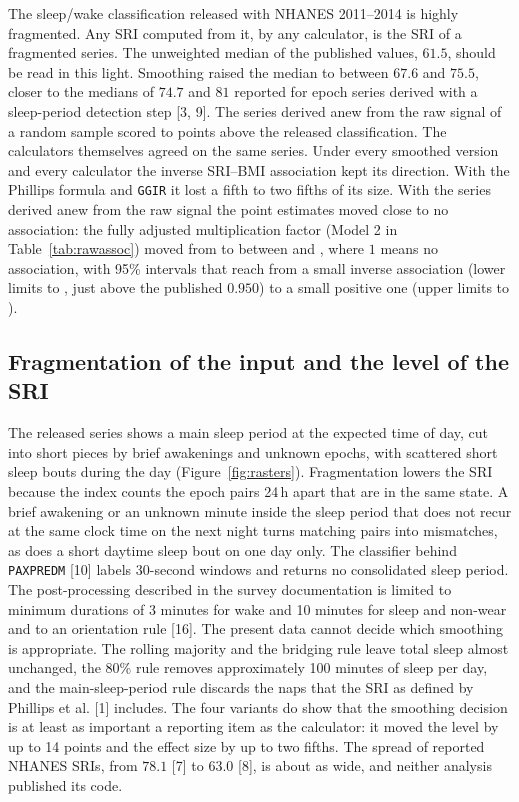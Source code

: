 \documentclass[12pt]{article}
\begin{document}
The sleep/wake classification released with NHANES 2011--2014 is highly fragmented. Any SRI computed from it, by any calculator, is the SRI of a fragmented series. The unweighted median of the published values, $61.5$, should be read in this light. Smoothing raised the median to between $67.6$ and $75.5$, closer
to the medians of $74.7$ and $81$ reported for epoch series derived with a
sleep-period detection step [3, 9]. The series derived anew from the raw signal of a random sample scored \rawSwanDiffMean{} to \rawGgirSptDiffMean{} points above the released
classification. The calculators themselves agreed on the same series. Under every smoothed version and every calculator the inverse SRI--BMI association kept its direction. With the Phillips formula and \texttt{GGIR} it lost a fifth to two fifths of its size. With the series derived anew from the raw signal the point estimates moved close to no association: the fully adjusted multiplication factor (Model 2 in Table~\ref{tab:rawassoc}) moved from \rawPaxpredmMBEst{} to between \rawSwanMBEst{} and \rawGgirSibMBEst{}, where $1$ means no association, with 95\% intervals that reach from a small inverse association (lower limits \rawSwanMBLo{} to \rawGgirSibMBLo{}, just above the published $0.950$) to a small positive one (upper limits \rawSwanMBHi{} to \rawGgirSibMBHi{}).

\subsection{Fragmentation of the input and the level of the SRI}
The released series shows a main sleep period at the expected time of day,
cut into short pieces by brief awakenings and unknown epochs, with scattered
short sleep bouts during the day (Figure~\ref{fig:rasters}). Fragmentation
lowers the SRI because the index counts the epoch pairs 24\,h apart that
are in the same state. A brief awakening or an unknown minute inside the sleep
period that does not recur at the same clock time on the next night turns matching pairs into mismatches, as does a short daytime sleep bout on one day only. The classifier behind \texttt{PAXPREDM} [10]
labels 30-second windows and returns no consolidated sleep period. The
post-processing described in the survey documentation is limited to minimum
durations of 3 minutes for wake and 10 minutes for sleep and non-wear and to
an orientation rule [16]. The
present data cannot decide which smoothing is appropriate. The rolling
majority and the bridging rule leave total sleep almost unchanged, the 80\%
rule removes approximately 100 minutes of sleep per day, and the main-sleep-period
rule discards the naps that the SRI as defined by Phillips et al. [1]
includes. The four variants do show that the smoothing decision is at least as important a
reporting item as the calculator: it moved the level by up to 14 points and
the effect size by up to two fifths. The spread of reported NHANES SRIs, from
$78.1$ [7] to $63.0$ [8], is about as wide,
and neither analysis published its code.
\end{document}
